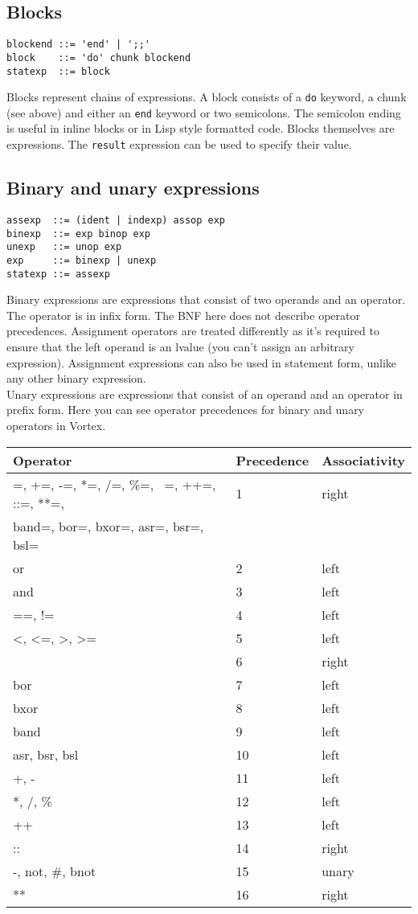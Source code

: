 \documentclass{article}
\begin{document}
\subsection{Blocks}
\begin{lstlisting}[language=bnf]
blockend ::= 'end' | ';;'
block    ::= 'do' chunk blockend
statexp  ::= block
\end{lstlisting}
Blocks represent chains of expressions. A block consists of a \verb|do|
keyword, a chunk (see above) and either an \verb|end| keyword or two
semicolons. The semicolon ending is useful in inline blocks or in
Lisp style formatted code. Blocks themselves are expressions. The \verb|result|
expression can be used to specify their value.
\subsection{Binary and unary expressions}
\begin{lstlisting}[language=bnf]
assexp  ::= (ident | indexp) assop exp
binexp  ::= exp binop exp
unexp   ::= unop exp
exp     ::= binexp | unexp
statexp ::= assexp
\end{lstlisting}
Binary expressions are expressions that consist of two operands and an
operator. The operator is in infix form. The BNF here does not describe
operator precedences. Assignment operators are treated differently as
it's required to ensure that the left operand is an lvalue (you can't
assign an arbitrary expression). Assignment expressions can also be used in
statement form, unlike any other binary expression.\\
Unary expressions are expressions that consist of an operand and an operator
in prefix form.
Here you can see operator precedences for binary and unary operators in Vortex.
\begin{center}
\begin{tabular}{| l | l | l |}
\hline
\textbf{Operator} & \textbf{Precedence} & \textbf{Associativity} \\ \hline
=, +=, -=, *=, /=, \%=, ~=, ++=, ::=, **=, & 1 & right \\
band=, bor=, bxor=, asr=, bsr=, bsl= & & \\ \hline
or & 2 & left \\ \hline
and & 3 & left \\ \hline
==, != & 4 & left \\ \hline
<, <=, >, >= & 5 & left \\ \hline
~ & 6 & right \\ \hline
bor & 7 & left \\ \hline
bxor & 8 & left \\ \hline
band & 9 & left \\ \hline
asr, bsr, bsl & 10 & left \\ \hline
+, - & 11 & left \\ \hline
*, /, \% & 12 & left \\ \hline
++ & 13 & left \\ \hline
:: & 14 & right \\ \hline
-, not, \#, bnot & 15 & unary \\ \hline
** & 16 & right \\ \hline
\end{tabular}
\end{center}
\end{document}
